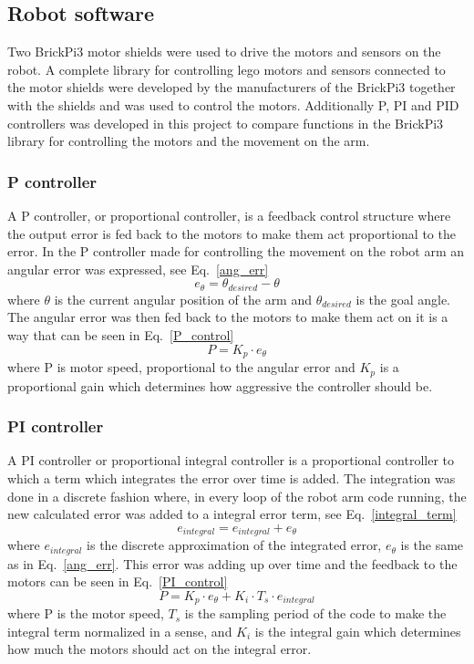 \subsection{Robot software}
Two BrickPi3 motor shields were used to drive the motors and sensors on the robot. A complete library for controlling lego motors and sensors connected to the motor shields were developed by the manufacturers of the BrickPi3 together with the shields and was used to control the motors. Additionally P, PI and PID controllers was developed in this project to compare functions in the BrickPi3 library for controlling the motors and the movement on the arm.
\subsubsection{P controller}
A P controller, or proportional controller, is a feedback control structure where the output error is fed back to the motors to make them act proportional to the error. In the P controller made for controlling the movement on the robot arm an angular error was expressed, see Eq.~\eqref{ang_err}
\begin{equation}
    e_{\theta} = \theta_{desired} - \theta
    \label{ang_err}
\end{equation}
where \(\theta\) is the current angular position of the arm and \(\theta_{desired}\) is the goal angle. The angular error was then fed back to the motors to make them act on it is a way that can be seen in Eq.~\eqref{P_control}
\begin{equation}
    P = K_p\cdot e_{\theta}
    \label{P_control}
\end{equation}
where P is motor speed, proportional to the angular error and \(K_p\) is a proportional gain which determines how aggressive the controller should be.

\subsubsection{PI controller}
A PI controller or proportional integral controller is a proportional controller to which a term which integrates the error over time is added. The integration was done in a discrete fashion where, in every loop of the robot arm code running, the new calculated error was added to a integral error term, see Eq.~\eqref{integral_term}
\begin{equation}
    e_{integral} = e_{integral} + e_{\theta}
    \label{integral_term}
\end{equation}
where \(e_{integral}\) is the discrete approximation of the integrated error, \(e_{\theta}\) is the same as in Eq.~\eqref{ang_err}. This error was adding up over time and the feedback to the motors can be seen in Eq.~\eqref{PI_control}
\begin{equation}
    P = K_p\cdot e_{\theta} + K_i\cdot T_s\cdot e_{integral}
    \label{PI_control}
\end{equation}
where P is the motor speed, \(T_s\) is the sampling period of the code to make the integral term normalized in a sense, and \(K_i\) is the integral gain which determines how much the motors should act on the integral error.

